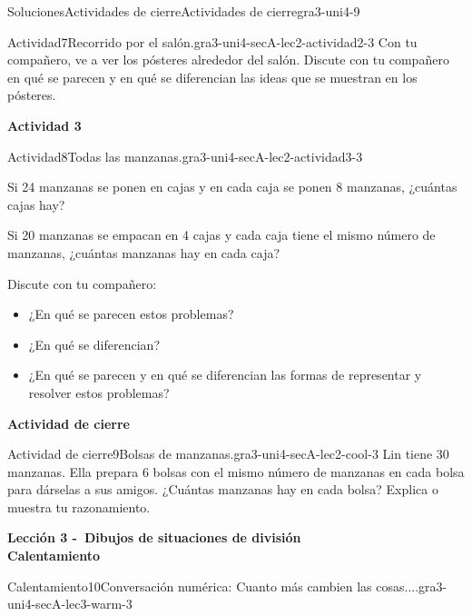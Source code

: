 \documentclass[twoside,10pt,]{article}
\begin{document}
\begin{solutions-section}{Soluciones}{Actividades de cierre}{}{Actividades de cierre}{}{}{gra3-uni4-9}
\begin{activitysolution}{Actividad}{7}{Recorrido por el salón.}{gra3-uni4-secA-lec2-actividad2-3}
Con tu compañero, ve a ver los pósteres alrededor del salón. Discute con tu compañero en qué se parecen y en qué se diferencian las ideas que se muestran en los pósteres.%
\end{activitysolution}%
\par\medskip
\noindent\textbf{\large{}\space\textperiodcentered\space{}Actividad 3}
\begin{activitysolution}{Actividad}{8}{Todas las manzanas.}{gra3-uni4-secA-lec2-actividad3-3}%
\begin{sidebyside}{2}{0.05}{0.05}{0.1}%
\begin{sbspanel}{0.4}%
Si 24 manzanas se ponen en cajas y en cada caja se ponen 8 manzanas, ¿cuántas cajas hay?%
\end{sbspanel}%
\begin{sbspanel}{0.4}%
\par
Si 20 manzanas se empacan en 4 cajas y cada caja tiene el mismo número de manzanas, ¿cuántas manzanas hay en cada caja?%
\end{sbspanel}%
\end{sidebyside}%
\par
Discute con tu compañero:%
\par
%
\begin{itemize}[label=\textbullet]
\item{}¿En qué se parecen estos problemas?%
\item{}¿En qué se diferencian?%
\item{}¿En qué se parecen y en qué se diferencian las formas de representar y resolver estos problemas?%
\end{itemize}
%
\end{activitysolution}%
\par\medskip
\noindent\textbf{\large{}\space\textperiodcentered\space{}Actividad de cierre}
\begin{projectsolution}{Actividad de cierre}{9}{Bolsas de manzanas.}{gra3-uni4-secA-lec2-cool-3}%
Lin tiene 30 manzanas. Ella prepara 6 bolsas con el mismo número de manzanas en cada bolsa para dárselas a sus amigos. ¿Cuántas manzanas hay en cada bolsa? Explica o muestra tu razonamiento.%
\end{projectsolution}%
\par\medskip
\noindent\textbf{\large{}\space\textperiodcentered\space{}Lección 3 -~Dibujos de situaciones de división\\
\space\textperiodcentered\space{}Calentamiento}
\begin{explorationsolution}{Calentamiento}{10}{Conversación numérica: Cuanto más cambien las cosas....}{gra3-uni4-secA-lec3-warm-3}%

\end{explorationsolution}
\end{solutions-section}
\end{document}
